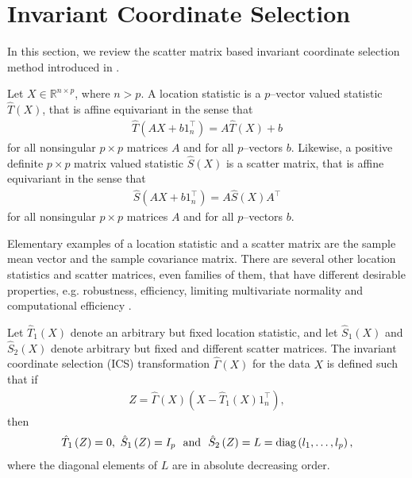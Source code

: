 \documentclass{llncs}
\begin{document}
\section{Invariant Coordinate Selection}\label{secpca}


In this section, we review the scatter matrix based invariant coordinate selection method introduced in \cite{TY}.


Let $X \in \mathbb{R}^{n\times p}$, where $n>p$. A location statistic is a $p$--vector valued statistic $\hat{T}\left(X\right)$, that is affine equivariant in the sense that
\begin{align*}
\hat{T}\left(AX+b1_n^\top\right)=A\hat{T}\left(X\right)+b
\end{align*}
for all nonsingular $p\times p$ matrices $A$ and for all $p$--vectors
$b$.
Likewise, a  
positive definite $p\times p$ matrix valued statistic $\hat{S}\left(X\right)$ is a scatter matrix, that is affine
equivariant in the sense that
\begin{align*}
\hat{S}\left(AX+b1_n^\top\right)=A\hat{S}\left(X\right)A^\top
\end{align*}
for all nonsingular $p\times p$ matrices $A$ and for all $p$--vectors
$b$.



Elementary examples of a location statistic and a scatter matrix are
the sample mean vector and the sample covariance matrix. There are several other location statistics and scatter matrices, even families of them, that have different desirable properties, e.g. robustness, efficiency, limiting multivariate normality and computational efficiency \cite{S3,S2,MMY}.





Let $\hat{T}_1\left(X\right)$ denote an arbitrary but fixed location statistic, and let $\hat{S}_1\left(X\right)$ and $\hat{S}_2\left(X\right)$ denote  arbitrary but fixed and different scatter matrices. The invariant coordinate selection (ICS) transformation $\hat{\Gamma}\left(X\right)$ for the data $X$ is  defined such that if 
\begin{align*}
Z=\hat{\Gamma}\left(X\right)\left(X-\hat{T}_1\left(X\right)1_n^\top \right),
 \end{align*}
 then
\begin{align*}
\hat{T}_1\left(Z\right)=0, \  \hat{S}_1\left(Z\right)=I_p  \ \mbox{ and } \  \hat{S}_2\left(Z\right)=L=\textnormal{diag}\left(l_1, \ldots, l_p\right),
\end{align*}
where the diagonal elements of  $L$ are in absolute decreasing order.
\end{document}
